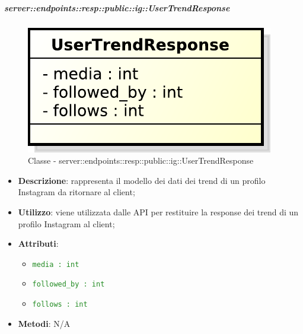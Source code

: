     \subparagraph{server::endpoints::resp::public::ig::UserTrendResponse} %
    \label{subp:bdsm_app_server_endpoints_resp_public_ig_usertrendresponse}
  \begin{figure}[!htbp]
    \centering
    \centerline{\includegraphics[scale=0.6]{./images/server/classes/endpoints/ig/user_trend_response.pdf}}
    \caption{Classe - server::endpoints::resp::public::ig::UserTrendResponse}
  \end{figure}
    \begin{itemize}
      \item \textbf{Descrizione}: rappresenta il modello dei dati dei trend di un profilo Instagram da ritornare al client;
      \item \textbf{Utilizzo}: viene utilizzata dalle API per restituire la response dei trend di un profilo Instagram al client;

    \item \textbf{Attributi}:
      \begin{itemize}
        \item \textcolor{forestgreen}{\texttt{media : int}}
        \item \textcolor{forestgreen}{\texttt{followed\_by : int}}
        \item \textcolor{forestgreen}{\texttt{follows : int}}
      \end{itemize}
    \item \textbf{Metodi}: N/A
      \end{itemize}

